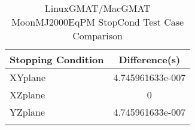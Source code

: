 \begin{table}[htbp!]
\centering
\caption{ LinuxGMAT/MacGMAT MoonMJ2000EqPM StopCond Test Case Comparison}
      \begin{tabular}{lc}
      \hline\hline
          Stopping Condition & Difference(s) \\
         \hline
         XYplane & 4.745961633e-007 \\
         XZplane & 0 \\
         YZplane & 4.745961633e-007 \\
      \hline\hline
      \label{Table: LinuxGMAT-MacGMAT MoonMJ2000EqPM StopCond Table} 
\end{tabular}
\end{table}
